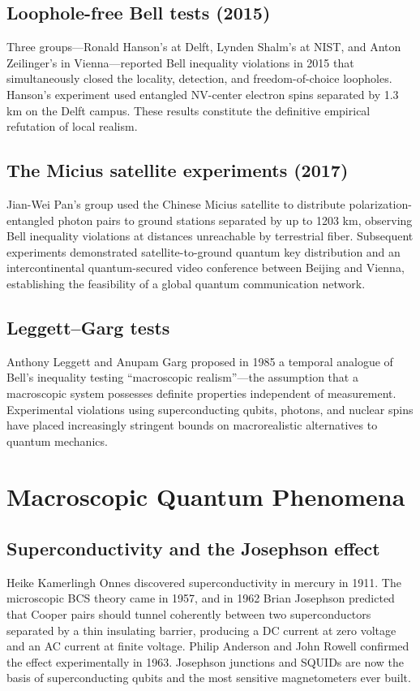 \documentclass[11pt]{article}
\begin{document}
\subsection{Loophole-free Bell tests (2015)}
Three groups---Ronald Hanson's at Delft, Lynden Shalm's at NIST, and Anton Zeilinger's in Vienna---reported Bell inequality violations in 2015 that simultaneously closed the locality, detection, and freedom-of-choice loopholes. Hanson's experiment used entangled NV-center electron spins separated by 1.3 km on the Delft campus. These results constitute the definitive empirical refutation of local realism.

\subsection{The Micius satellite experiments (2017)}
Jian-Wei Pan's group used the Chinese Micius satellite to distribute polarization-entangled photon pairs to ground stations separated by up to 1203 km, observing Bell inequality violations at distances unreachable by terrestrial fiber. Subsequent experiments demonstrated satellite-to-ground quantum key distribution and an intercontinental quantum-secured video conference between Beijing and Vienna, establishing the feasibility of a global quantum communication network.

\subsection{Leggett--Garg tests}
Anthony Leggett and Anupam Garg proposed in 1985 a temporal analogue of Bell's inequality testing ``macroscopic realism''---the assumption that a macroscopic system possesses definite properties independent of measurement. Experimental violations using superconducting qubits, photons, and nuclear spins have placed increasingly stringent bounds on macrorealistic alternatives to quantum mechanics.

\section{Macroscopic Quantum Phenomena}

\subsection{Superconductivity and the Josephson effect}
Heike Kamerlingh Onnes discovered superconductivity in mercury in 1911. The microscopic BCS theory came in 1957, and in 1962 Brian Josephson predicted that Cooper pairs should tunnel coherently between two superconductors separated by a thin insulating barrier, producing a DC current at zero voltage and an AC current at finite voltage. Philip Anderson and John Rowell confirmed the effect experimentally in 1963. Josephson junctions and SQUIDs are now the basis of superconducting qubits and the most sensitive magnetometers ever built.
\end{document}
